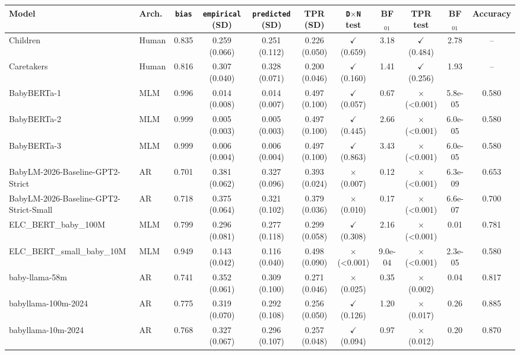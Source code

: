 \begin{table}[]
\begin{adjustbox}{max width=\textwidth}
\begin{tabular}{llccccccccc}
\toprule
Model & Arch. & \texttt{bias} & \texttt{empirical} (SD) & \texttt{predicted} (SD) & TPR (SD) & \texttt{D$\times$N} test & BF$_{01}$ & TPR test & BF$_{01}$ & Accuracy \\
\midrule
Children & Human & 0.835 & 0.259 (0.066) & 0.251 (0.112) & 0.226 (0.050) & $\checkmark$ (0.659) & 3.18 & $\checkmark$ (0.484) & 2.78 & -- \\
Caretakers & Human & 0.816 & 0.307 (0.040) & 0.328 (0.071) & 0.200 (0.046) & $\checkmark$ (0.160) & 1.41 & $\checkmark$ (0.256) & 1.93 & -- \\
\midrule
BabyBERTa-1 & MLM & 0.996 & 0.014 (0.008) & 0.014 (0.007) & 0.497 (0.100) & $\checkmark$ (0.057) & 0.67 & $\times$ (<0.001) & 5.8e-05 & 0.580 \\
BabyBERTa-2 & MLM & 0.999 & 0.005 (0.003) & 0.005 (0.003) & 0.497 (0.100) & $\checkmark$ (0.445) & 2.66 & $\times$ (<0.001) & 6.0e-05 & 0.580 \\
BabyBERTa-3 & MLM & 0.999 & 0.006 (0.004) & 0.006 (0.004) & 0.497 (0.100) & $\checkmark$ (0.863) & 3.43 & $\times$ (<0.001) & 6.0e-05 & 0.580 \\
BabyLM-2026-Baseline-GPT2-Strict & AR & 0.701 & 0.381 (0.062) & 0.327 (0.096) & 0.393 (0.024) & $\times$ (0.007) & 0.12 & $\times$ (<0.001) & 6.3e-09 & 0.653 \\
BabyLM-2026-Baseline-GPT2-Strict-Small & AR & 0.718 & 0.375 (0.064) & 0.321 (0.102) & 0.379 (0.036) & $\times$ (0.010) & 0.17 & $\times$ (<0.001) & 6.6e-07 & 0.700 \\
ELC_BERT_baby_100M & MLM & 0.799 & 0.296 (0.081) & 0.277 (0.118) & 0.299 (0.058) & $\checkmark$ (0.308) & 2.16 & $\times$ (<0.001) & 0.01 & 0.781 \\
ELC_BERT_small_baby_10M & MLM & 0.949 & 0.143 (0.042) & 0.116 (0.040) & 0.498 (0.090) & $\times$ (<0.001) & 9.0e-04 & $\times$ (<0.001) & 2.3e-05 & 0.580 \\
baby-llama-58m & AR & 0.741 & 0.352 (0.061) & 0.309 (0.100) & 0.271 (0.046) & $\times$ (0.025) & 0.35 & $\times$ (0.002) & 0.04 & 0.817 \\
babyllama-100m-2024 & AR & 0.775 & 0.319 (0.070) & 0.292 (0.108) & 0.256 (0.050) & $\checkmark$ (0.126) & 1.20 & $\times$ (0.017) & 0.26 & 0.885 \\
babyllama-10m-2024 & AR & 0.768 & 0.327 (0.067) & 0.296 (0.107) & 0.257 (0.048) & $\checkmark$ (0.094) & 0.97 & $\times$ (0.012) & 0.20 & 0.870 \\

\end{tabular}
\end{adjustbox}
\end{table}
